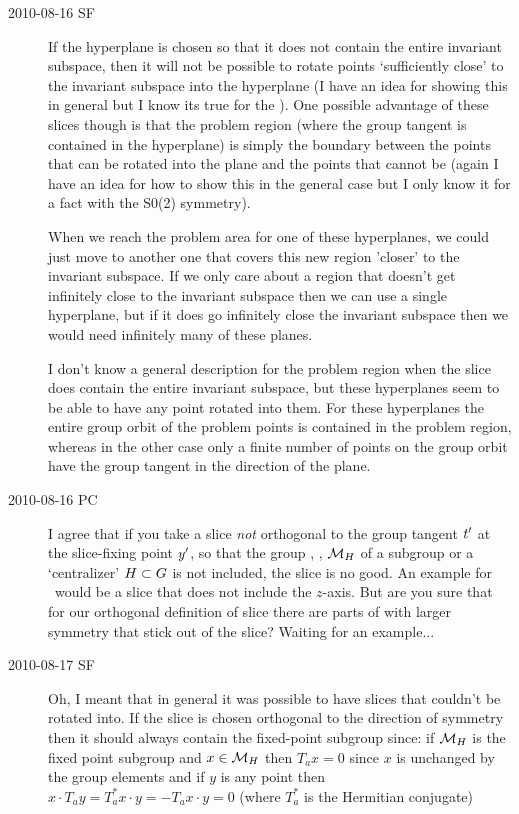 \begin{description}
\item[2010-08-16 SF]
If the hyperplane is chosen so that it does not contain the
entire invariant subspace, then it will not be possible to
rotate points `sufficiently close' to the invariant subspace
into the hyperplane (I have an idea for showing this in
general but I know its true for the \cLe ). One possible
advantage of these slices though is that the problem region
(where the group tangent is contained in the hyperplane) is
simply the boundary between the points that can be rotated
into the plane and the points that cannot be (again I have an
idea for how to show this in the general case but I only know
it for a fact with the S0(2) symmetry).

When we reach the problem area for one of these hyperplanes,
we could just move to another one that covers this new region
'closer' to the invariant subspace. If we only care about a
region that doesn't get infinitely close to the invariant
subspace then we can use a single hyperplane, but if it does
go infinitely close the invariant subspace then we would need
infinitely many of these planes.

I don't know a general description for the problem region
when the slice does contain the entire invariant subspace,
but these hyperplanes seem to be able to have any point
rotated into them. For these hyperplanes the entire group
orbit of the problem points is contained in the problem
region, whereas in the other case only a finite number of
points on the group orbit have the group tangent in the
direction of the plane.

\item[2010-08-16 PC]
I agree that if you take a slice \emph{not} orthogonal to the group
tangent $t'_{}$ at the slice-fixing point ${y'}$,
so that the group {\fixedsp}, \ie,
${\cal M}_H$ of a subgroup or a `centralizer' $H \subset G$
 is not included, the slice is no
good. An example for \cLe\ would be a slice
that does not include the $z$-axis.
But are you sure that for our orthogonal definition
of slice there are parts of {\statesp} with larger symmetry
that stick out of the slice? Waiting for an example...

\item[2010-08-17 SF]
Oh, I meant that in general it was possible to have slices that couldn't be rotated into. If the slice is chosen orthogonal to the direction of symmetry then it should always contain the fixed-point subgroup since: if ${\cal M}_H$ is the fixed point subgroup and $x \in {\cal M}_H$ then $T_a x=0$ since $x$ is unchanged by the group elements and if $y$ is any point then $x \cdot T_a y=T_a^* x \cdot y=-T_a x \cdot y=0$ (where $T_a^*$ is the Hermitian conjugate)


\end{description}
